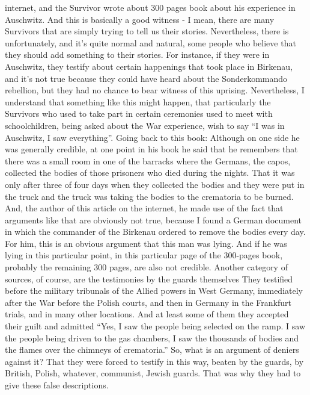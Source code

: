internet, and the Survivor wrote about 300 pages book about his experience in Auschwitz. And this is basically a good witness - I mean, there are many Survivors that are simply trying to tell us their stories. Nevertheless, there is unfortunately, and it's quite normal and natural, some people who believe that they should add something to their stories. For instance, if they were in Auschwitz, they testify about certain happenings that took place in Birkenau, and it’s not true because they could have heard about the Sonderkommando rebellion, but they had no chance to bear witness of this uprising. Nevertheless, I understand that something like this might happen, that particularly the Survivors who used to take part in certain ceremonies used to meet with schoolchildren, being asked about the War experience, wish to say ``I was in Auschwitz, I saw everything''. Going back to this book: Although on one side he was generally credible, at one point in his book he said that he remembers that there was a small room in one of the barracks where the Germans, the capos, collected the bodies of those prisoners who died during the nights. That it was only after three of four days when they collected the bodies and they were put in the truck and the truck was taking the bodies to the crematoria to be burned. And, the author of this article on the internet, he made use of the fact that arguments like that are obviously not true, because I found a German document in which the commander of the Birkenau ordered to remove the bodies every day. For him, this is an obvious argument that this man was lying. And if he was lying in this particular point, in this particular page of the 300-pages book, probably the remaining 300 pages, are also not credible. 
Another category of sources, of course, are the testimonies by the guards themselves They testified before the military tribunals of the Allied powers in West Germany, immediately after the War before the Polish courts, and then in Germany in the Frankfurt trials, and in many other locations. And at least some of them they accepted their guilt and admitted ``Yes, I saw the people being selected on the ramp. I saw the people being driven to the gas chambers, I saw the thousands of bodies and the flames over the chimneys of crematoria.'' So, what is an argument of deniers against it? That they were forced to testify in this way, beaten by the guards, by British, Polish, whatever, communist, Jewish guards. That was why they had to give these false descriptions. 
